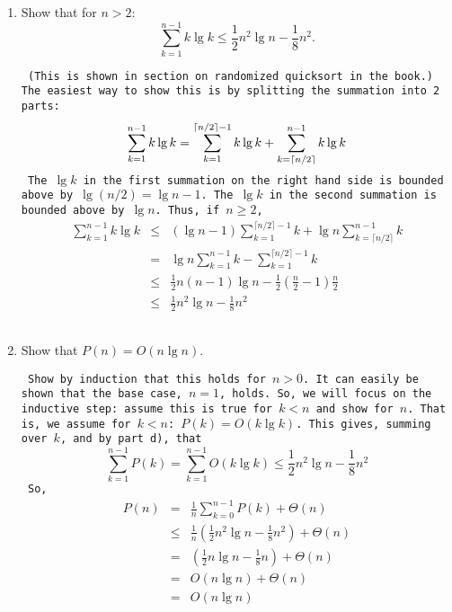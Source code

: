 \begin{enumerate}
\begin{enumerate}
	    \item Show that for $n > 2$: 
		$$
		    \sum_{k=1}^{n-1} k \lg k \leq \frac{1}{2}n^2\lg n 
			- \frac{1}{8}n^2.
		$$

{\tt
(This is shown in section on randomized quicksort in the book.)
The easiest way to show this is by splitting the summation into 2 parts:
$$
    \sum_{k=1}^{n-1} k \lg k 
	= \sum_{k=1}^{\lceil{n/2}\rceil -1} k \lg k 
		+ \sum_{k=\lceil{n/2}\rceil}^{n-1} k \lg k \\
$$
The $\lg k$ in the first summation on the right hand side is bounded
above by $\lg(n/2)= \lg n - 1$.  The $\lg k$ in the second summation 
is bounded above by $\lg n$.  
Thus, if $n \geq 2$,
$$
\begin{array}{rcl}
    \sum_{k=1}^{n-1} k \lg k 
	&\leq& (\lg n - 1)\sum_{k=1}^{\lceil{n/2}\rceil -1} k  
		+ \lg n \sum_{k=\lceil{n/2}\rceil}^{n-1} k \\
	&=& \lg n \sum_{k=1}^{n-1} k  
		- \sum_{k=1}^{\lceil{n/2}\rceil-1} k \\
	&\leq& \frac{1}{2}n(n-1)\lg n  
		- \frac{1}{2}(\frac{n}{2}-1)\frac{n}{2}\\
	&\leq& \frac{1}{2}n^2\lg n  - \frac{1}{8}n^2
\end{array}
$$
}

	    \item Show that $P(n) = O(n\lg n)$.

{\tt
Show by induction that this holds for $n>0$.  It can easily be shown
that the base case, $n=1$, holds.  So, we will focus on the inductive
step:  assume this is true for $k<n$ and show for $n$.  That is, we
assume for $k<n$: $P(k) = O(k\lg k)$.  This gives, summing over $k$,
and by part d), that 
$$
    \sum_{k=1}^{n-1}P(k) = \sum_{k=1}^{n-1}O(k\lg k)
	    	\leq \frac{1}{2}n^2\lg n - \frac{1}{8}n^2
$$
So, 
\[
\begin{array}{rcl}
    P(n) &=& \frac{1}{n} \sum_{k=0}^{n-1} P(k) + \Theta(n)\\
    	&\leq& \frac{1}{n} (\frac{1}{2}n^2\lg n - \frac{1}{8}n^2)
    	+ \Theta(n)\\
    	&=& (\frac{1}{2}n\lg n - \frac{1}{8}n) + \Theta(n)\\
    	&=& O(n\lg n) + \Theta(n)\\
    	&=& O(n\lg n)
\end{array}
\]

}


	\end{enumerate}

\end{enumerate}




